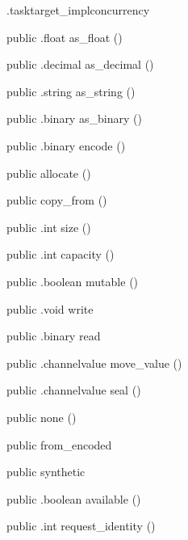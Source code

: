 \begin{CrexxClass}{.tasktarget\_impl}{concurrency}
\begin{Members}
    \Method
      {public}
      {.float}
      {as\_float}
      {()}

    \Method
      {public}
      {.decimal}
      {as\_decimal}
      {()}

    \Method
      {public}
      {.string}
      {as\_string}
      {()}

    \Method
      {public}
      {.binary}
      {as\_binary}
      {()}

    \Method
      {public}
      {.binary}
      {encode}
      {()}

    \Factory
      {public}
      {allocate}
      {()}

    \Factory
      {public}
      {copy\_from}
      {()}

    \Method
      {public}
      {.int}
      {size}
      {()}

    \Method
      {public}
      {.int}
      {capacity}
      {()}

    \Method
      {public}
      {.boolean}
      {mutable}
      {()}

    \Method
      {public}
      {.void}
      {write}
      {}

    \Method
      {public}
      {.binary}
      {read}
      {}

    \Method
      {public}
      {.channelvalue}
      {move\_value}
      {()}

    \Method
      {public}
      {.channelvalue}
      {seal}
      {()}

    \Factory
      {public}
      {none}
      {()}

    \Factory
      {public}
      {from\_encoded}
      {}

    \Factory
      {public}
      {synthetic}
      {}

    \Method
      {public}
      {.boolean}
      {available}
      {()}

    \Method
      {public}
      {.int}
      {request\_identity}
      {()}


\end{Members}
\end{CrexxClass}
